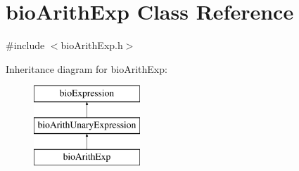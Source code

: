 \hypertarget{classbio_arith_exp}{}\section{bio\+Arith\+Exp Class Reference}
\label{classbio_arith_exp}


{\ttfamily \#include $<$bio\+Arith\+Exp.\+h$>$}

Inheritance diagram for bio\+Arith\+Exp\+:\begin{figure}[H]
\begin{center}
\leavevmode
\includegraphics[height=3.000000cm]{classbio_arith_exp}
\end{center}
\end{figure}
